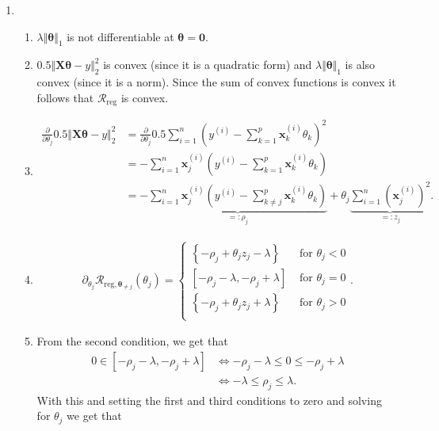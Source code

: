 \begin{enumerate}
\item  
\begin{enumerate}
    \item $\lambda\Vert \bm{\theta}\Vert_1$ is not differentiable at $\bm{\theta} = \bm{0}.$
    \item $0.5\Vert \mathbf{X}\bm{\theta} - y\Vert^2_2$ is convex (since it is a quadratic form) and $\lambda\Vert \bm{\theta}\Vert_1$ is also convex (since it is a norm). Since the sum of convex functions is convex it follows that $\mathcal{R}_\text{reg}$ is convex. 
    \item 
    \begin{align*}
        \frac{\partial}{\partial\theta_j}0.5\Vert \mathbf{X}\bm{\theta} - y\Vert^2_2 &= \frac{\partial}{\partial\theta_j} 0.5\sum^n_{i=1}\left(y^{(i)} - \sum^p_{k=1}\bm{x}_k^{(i)}\theta_k  \right)^2 \\
        &=-\sum^n_{i=1}\bm{x}_j^{(i)}\left(y^{(i)} - \sum^p_{k=1}\bm{x}_k^{(i)}\theta_k  \right) \\
        &=-\underbrace{\sum^n_{i=1}\bm{x}_j^{(i)}\left(y^{(i)} - \sum^p_{k\neq j}\bm{x}_k^{(i)}\theta_k  \right)}_{=:\rho_j} + \theta_j\underbrace{\sum^n_{i=1}\left(\bm{x}_j^{(i)}\right)^2}_{=:z_j}.
    \end{align*}
    \item \begin{align*}
        \partial_{\theta_j}\mathcal{R}_{\text{reg}, \bm{\theta}_{\neq j}}(\theta_j) = \begin{cases}
            \left\{-\rho_j + \theta_j z_j - \lambda\right\} & \text{ for } \theta_j < 0 \\
            [-\rho_j  - \lambda, -\rho_j  + \lambda] & \text{ for } \theta_j = 0 \\
            \left\{-\rho_j + \theta_j z_j + \lambda\right\} & \text{ for } \theta_j > 0 \\
        \end{cases}.
    \end{align*}
    \item From the second condition, we get that 
    \begin{align*}
        0 \in [-\rho_j  - \lambda, -\rho_j  + \lambda] &\iff -\rho_j  - \lambda \leq 0 \leq -\rho_j  + \lambda \\
        &\iff - \lambda \leq \rho_j  \leq  \lambda.
    \end{align*}
    With this and setting the first and third conditions to zero and solving for $\theta_j$ we get that 

\end{enumerate}
\end{enumerate}
